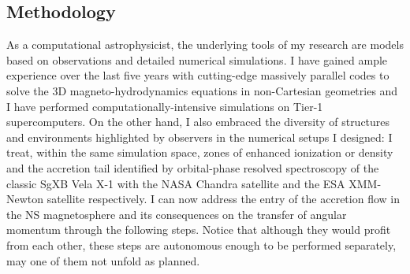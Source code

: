 \documentclass[letterpaper,12pt,onecolumn]{article}
\makeatletter
\newcommand{\sgx}{SgXB\xspace}
\newcommand*{\ns}{NS\@\xspace}
\makeatother
\begin{document}


\subsection*{Methodology}

As a computational astrophysicist, the underlying tools of my research are models based on observations and detailed numerical simulations. I have gained ample experience over the last five years with cutting-edge massively parallel codes to solve the 3D magneto-hydrodynamics equations in non-Cartesian geometries and I have performed computationally-intensive simulations on Tier-1 supercomputers. On the other hand, I also embraced the diversity of structures and environments highlighted by observers in the numerical setups I designed: I treat, within the same simulation space, zones of enhanced ionization or density \citep{ElMellah} and the accretion tail \citep{ElMellah2015} identified by orbital-phase resolved spectroscopy of the classic \sgx Vela X-1 with the NASA Chandra satellite \citep{Grinberg2017} and the ESA XMM-Newton satellite \citep{Martinez-Nunez2014} respectively. I can now address the entry of the accretion flow in the \ns magnetosphere and its consequences on the transfer of angular momentum through the following steps. Notice that although they would profit from each other, these steps are autonomous enough to be performed separately, may one of them not unfold as planned.
\end{document}
